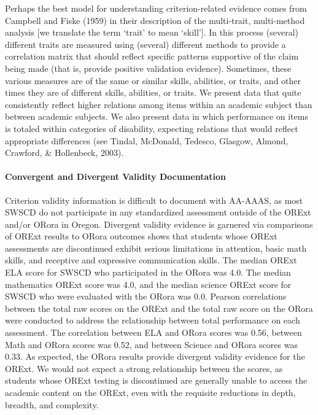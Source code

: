 \documentclass[]{article}
\let\oldparagraph\paragraph
\renewcommand{\paragraph}[1]{\oldparagraph{#1}\mbox{}}
\begin{document}
Perhaps the best model for understanding criterion-related evidence
comes from Campbell and Fiske (1959) in their description of the
multi-trait, multi-method analysis {[}we translate the term `trait' to
mean `skill'{]}. In this process (several) different traits are measured
using (several) different methods to provide a correlation matrix that
should reflect specific patterns supportive of the claim being made
(that is, provide positive validation evidence). Sometimes, these
various measures are of the same or similar skills, abilities, or
traits, and other times they are of different skills, abilities, or
traits. We present data that quite consistently reflect higher relations
among items within an academic subject than between academic subjects.
We also present data in which performance on items is totaled within
categories of disability, expecting relations that would reflect
appropriate differences (see Tindal, McDonald, Tedesco, Glasgow, Almond,
Crawford, \& Hollenbeck, 2003).

\hypertarget{convergent-and-divergent-validity-documentation}{%
\paragraph{Convergent and Divergent Validity
Documentation}\label{convergent-and-divergent-validity-documentation}}

Criterion validity information is difficult to document with AA-AAAS, as
most SWSCD do not participate in any standardized assessment outside of
the ORExt and/or ORora in Oregon. Divergent validity evidence is
garnered via comparisons of ORExt results to ORora outcomes shows that
students whose ORExt assessments are discontinued exhibit serious
limitations in attention, basic math skills, and receptive and
expressive communication skills. The median ORExt ELA score for SWSCD
who participated in the ORora was 4.0. The median mathematics ORExt
score was 4.0, and the median science ORExt score for SWSCD who were
evaluated with the ORora was 0.0. Pearson correlations between the total
raw scores on the ORExt and the total raw score on the ORora were
conducted to address the relationship between total performance on each
assessment. The correlation between ELA and ORora scores was 0.56,
between Math and ORora scores was 0.52, and between Science and ORora
scores was 0.33. As expected, the ORora results provide divergent
validity evidence for the ORExt. We would not expect a strong
relationship between the scores, as students whose ORExt testing is
discontinued are generally unable to access the academic content on the
ORExt, even with the requisite reductions in depth, breadth, and
complexity.
\end{document}
